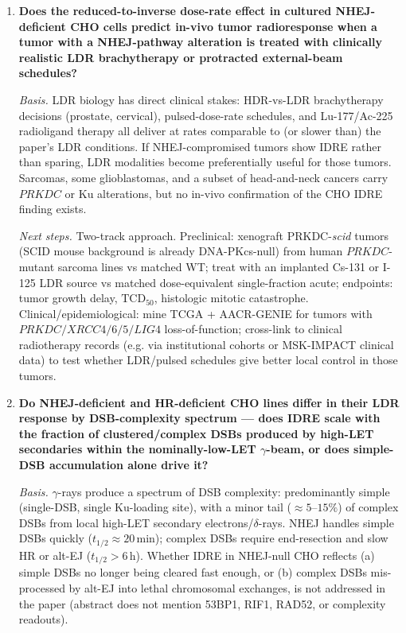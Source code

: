 \begin{enumerate}
\item \textbf{Does the reduced-to-inverse dose-rate effect in cultured NHEJ-deficient CHO cells
  predict in-vivo tumor radioresponse when a tumor with a NHEJ-pathway alteration is treated
  with clinically realistic LDR brachytherapy or protracted external-beam schedules?}

  \emph{Basis.} LDR biology has direct clinical stakes: HDR-vs-LDR brachytherapy decisions
  (prostate, cervical), pulsed-dose-rate schedules, and Lu-177/Ac-225 radioligand therapy all
  deliver at rates comparable to (or slower than) the paper's LDR conditions. If
  NHEJ-compromised tumors show IDRE rather than sparing, LDR modalities become preferentially
  useful for those tumors. Sarcomas, some glioblastomas, and a subset of head-and-neck cancers
  carry $PRKDC$ or Ku alterations, but no in-vivo confirmation of the CHO IDRE finding exists.

  \emph{Next steps.} Two-track approach. Preclinical: xenograft PRKDC-\emph{scid} tumors
  (SCID mouse background is already DNA-PKcs-null) from human $PRKDC$-mutant sarcoma lines vs
  matched WT; treat with an implanted Cs-131 or I-125 LDR source vs matched dose-equivalent
  single-fraction acute; endpoints: tumor growth delay, $\mathrm{TCD}_{50}$, histologic
  mitotic catastrophe. Clinical/epidemiological: mine TCGA + AACR-GENIE for tumors with
  $PRKDC/XRCC4/6/5/LIG4$ loss-of-function; cross-link to clinical radiotherapy records
  (e.g. via institutional cohorts or MSK-IMPACT clinical data) to test whether LDR/pulsed
  schedules give better local control in those tumors.

\item \textbf{Do NHEJ-deficient and HR-deficient CHO lines differ in their LDR response by
  DSB-complexity spectrum --- does IDRE scale with the fraction of clustered/complex DSBs
  produced by high-LET secondaries within the nominally-low-LET $\gamma$-beam, or does
  simple-DSB accumulation alone drive it?}

  \emph{Basis.} $\gamma$-rays produce a spectrum of DSB complexity: predominantly simple
  (single-DSB, single Ku-loading site), with a minor tail ($\approx5$--$15\%$) of complex DSBs
  from local high-LET secondary electrons/$\delta$-rays. NHEJ handles simple DSBs quickly
  ($t_{1/2}\approx20$\,min); complex DSBs require end-resection and slow HR or alt-EJ
  ($t_{1/2}>6$\,h). Whether IDRE in NHEJ-null CHO reflects (a) simple DSBs no longer being
  cleared fast enough, or (b) complex DSBs mis-processed by alt-EJ into lethal chromosomal
  exchanges, is not addressed in the paper (abstract does not mention 53BP1, RIF1, RAD52, or
  complexity readouts).


\end{enumerate}
